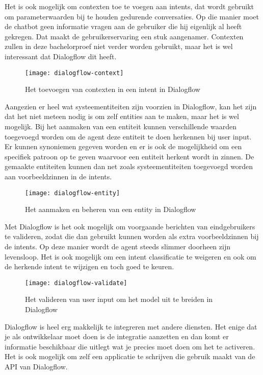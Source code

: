 Het is ook mogelijk om contexten toe te voegen aan intents, dat wordt gebruikt om parameterwaarden bij te houden gedurende conversaties. Op die manier moet de chatbot geen informatie vragen aan de gebruiker die hij eigenlijk al heeft gekregen. Dat maakt de gebruikerservaring een stuk aangenamer. Contexten zullen in deze bachelorproef niet verder worden gebruikt, maar het is wel interessant dat Dialogflow dit heeft.

\begin{figure}[H]
    \label{fig:dialogflow-context}
    \centering
    \texttt{[image: dialogflow-context]}
    \caption{Het toevoegen van contexten in een intent in Dialogflow}
\end{figure}

Aangezien er heel wat systeementiteiten zijn voorzien in Dialogflow, kan het zijn dat het niet meteen nodig is om zelf entities aan te maken, maar het is wel mogelijk. Bij het aanmaken van een entiteit kunnen verschillende waarden toegevoegd worden om de agent deze entiteit te doen herkennen bij user input. Er kunnen synoniemen gegeven worden en er is ook de mogelijkheid om een specifiek patroon op te geven waarvoor een entiteit herkent wordt in zinnen. De gemaakte entiteiten kunnen dan net zoals systeementiteiten toegevoegd worden aan voorbeeldzinnen in de intents.

\begin{figure}[H]
    \label{fig:dialogflow-entity}
    \centering
    \texttt{[image: dialogflow-entity]}
    \caption{Het aanmaken en beheren van een entity in Dialogflow}
\end{figure}

Met Dialogflow is het ook mogelijk om voorgaande berichten van eindgebruikers te valideren, zodat die dan gebruikt kunnen worden als extra voorbeeldzinnen bij de intents. Op deze manier wordt de agent steeds slimmer doorheen zijn levensloop. Het is ook mogelijk om een intent classificatie te weigeren en ook om de herkende intent te wijzigen en toch goed te keuren. 

\begin{figure}[H]
    \label{fig:dialogflow-validate}
    \centering
    \texttt{[image: dialogflow-validate]}
    \caption{Het valideren van user input om het model uit te breiden in Dialogflow}
\end{figure}

Dialogflow is heel erg makkelijk te integreren met andere diensten. Het enige dat je als ontwikkelaar moet doen is de integratie aanzetten en dan komt er informatie beschikbaar die uitlegt wat je precies moet doen om het te activeren. Het is ook mogelijk om zelf een applicatie te schrijven die gebruik maakt van de API van Dialogflow.

